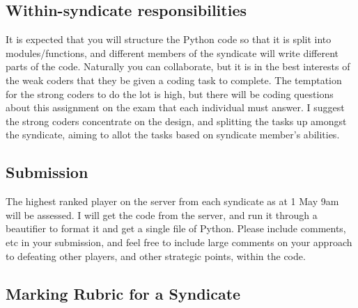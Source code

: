 \documentclass{article}
\begin{document}
\subsection{Within-syndicate responsibilities}

It is expected that you will structure the Python code so that it is
split into modules/functions, and different members of the syndicate
will write different parts of the code.
Naturally you can collaborate, but it is in the best interests of the weak
coders that they be given a coding task to complete.
The temptation for the strong coders to do the lot is high, but there
will be coding questions about this assignment on the exam that each
individual must answer.
I suggest the strong coders concentrate on the design, and splitting
the tasks up amongst the syndicate, aiming to allot the tasks
based on syndicate member's abilities.

\subsection{Submission}

The highest ranked player on the server from each syndicate as at
1 May 9am will be assessed.  I will get the code from the server,
and run it through a beautifier to format it and get a single file
of Python.  Please include comments, etc in your submission, and
feel free to include large comments on your approach to defeating
other players, and other strategic points, within the code.


\subsection{Marking Rubric for a Syndicate}

\renewcommand{\arraystretch}{2}
\end{document}
